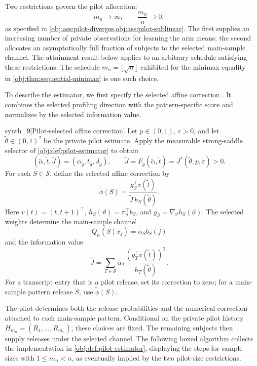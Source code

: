 \documentclass[11pt]{article}
\begin{document}
Two restrictions govern the pilot allocation:
\[
m_n\longrightarrow\infty,
\qquad
\frac{m_n}{n}\longrightarrow0,
\]
as specified in \cref{obj:ass:pilot-diverges,obj:ass:pilot-sublinear}. The first supplies an increasing number of private observations for learning the arm means; the second allocates an asymptotically full fraction of subjects to the selected main-sample channel. The attainment result below applies to an arbitrary schedule satisfying these restrictions. The schedule \(m_n=\lfloor\sqrt n\rfloor\) exhibited for the minimax equality in \cref{obj:thm:sequential-minimax} is one such choice.

To describe the estimator, we first specify the selected affine correction . It combines the selected profiling direction with the pattern-specific score and normalizes by the selected information value.

\begin{definitionv}{synth_9}[Pilot-selected affine correction]
Let \(p\in(0,1)\), \(\varepsilon>0\), and let \(\widetilde\theta\in(0,1)^2\) be the private pilot estimate. Apply the measurable strong-saddle selector of \cref{obj:def:pilot-estimator} to obtain
\[
(\widetilde\alpha,\widetilde t,\widetilde J)
=(\alpha_{\widetilde\theta},t_{\widetilde\theta},J_{\widetilde\theta}),
\qquad
\widetilde J
=F_{\widetilde\theta}(\widetilde\alpha,\widetilde t)
=J^*(\widetilde\theta,p,\varepsilon)>0.
\]
For each \(S\in\mathcal S\), define the selected affine correction by
\[
\widetilde\phi(S)
=\frac{g_S^{\top}v(\widetilde t)}
       {\widetilde J\,h_S(\widetilde\theta)}.
\]
Here \(v(t)=(t,t+1)^{\top}\), \(h_S(\vartheta)=\pi_\vartheta^{\top}b_S\), and \(g_S=\nabla_\vartheta h_S(\vartheta)\). The selected weights determine the main-sample channel
\[
Q_{\widetilde\alpha}(S\mid x_j)=\widetilde\alpha_S b_S(j)
\]
and the information value
\[
\widetilde J
=\sum_{T\in\mathcal S}
\widetilde\alpha_T
\frac{(g_T^{\top}v(\widetilde t))^2}
     {h_T(\widetilde\theta)}.
\]
For a transcript entry that is a pilot release, set its correction to zero; for a main-sample pattern release \(S\), use \(\widetilde\phi(S)\).
\end{definitionv}

The pilot determines both the release probabilities and the numerical correction attached to each main-sample pattern. Conditional on the private pilot history \(H_{m_n}=(R_1,\ldots,R_{m_n})\), these choices are fixed. The remaining subjects then supply releases under the selected channel. The following boxed algorithm collects the implementation in \cref{obj:def:pilot-estimator}, displaying the steps for sample sizes with \(1\le m_n<n\), as eventually implied by the two pilot-size restrictions.
\end{document}
